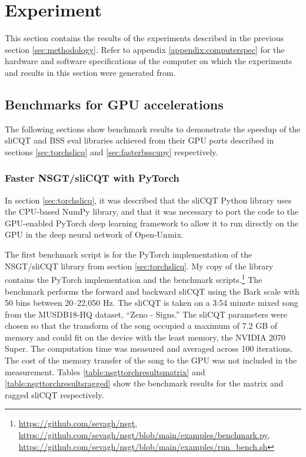 \documentclass[report.tex]{subfiles}
\begin{document}
\section{Experiment}
\label{sec:experiment}


This section contains the results of the experiments described in the previous section \ref{sec:methodology}. Refer to appendix \ref{appendix:computerspec} for the hardware and software specifications of the computer on which the experiments and results in this section were generated from.

\subsection{Benchmarks for GPU accelerations}

The following sections show benchmark results to demonstrate the speedup of the sliCQT and BSS eval libraries achieved from their GPU ports described in sections \ref{sec:torchslicq} and \ref{sec:fasterbsscupy} respectively.

\subsubsection{Faster NSGT/sliCQT with PyTorch}

In section \ref{sec:torchslicq}, it was described that the sliCQT Python library uses the CPU-based NumPy library, and that it was necessary to port the code to the GPU-enabled PyTorch deep learning framework to allow it to run directly on the GPU in the deep neural network of Open-Unmix.

The first benchmark script is for the PyTorch implementation of the NSGT/sliCQT library from section \ref{sec:torchslicq}. My copy of the library contains the PyTorch implementation and the benchmark scripts.\footnote{\url{https://github.com/sevagh/nsgt}, \url{https://github.com/sevagh/nsgt/blob/main/examples/benchmark.py}, \url{https://github.com/sevagh/nsgt/blob/main/examples/run_bench.sh}} The benchmark performs the forward and backward sliCQT using the Bark scale with 50 bins between 20--22,050 Hz. The sliCQT is taken on a 3:54 minute mixed song from the MUSDB18-HQ dataset, ``Zeno - Signs.'' The sliCQT parameters were chosen so that the transform of the song occupied a maximum of 7.2 GB of memory and could fit on the device with the least memory, the NVIDIA 2070 Super. The computation time was measured and averaged across 100 iterations. The cost of the memory transfer of the song to the GPU was not included in the measurement. Tables \ref{table:nsgttorchresultsmatrix} and \ref{table:nsgttorchresultsragged} show the benchmark results for the matrix and ragged sliCQT respectively.
\end{document}
